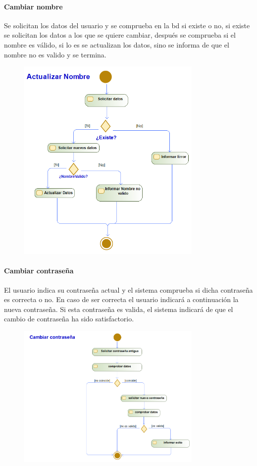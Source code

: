 \paragraph{Cambiar nombre}
Se solicitan los datos del usuario y se comprueba en la \gls{bd} si existe o no, si existe se solicitan los datos a los que se quiere cambiar, después se comprueba si el nombre es válido, si lo es se actualizan los datos, sino se informa de que el nombre no es valido y se termina.
\begin{figure}[H]
    \centering
    \includegraphics[width=0.8\textwidth]{Use_Cases/Actualizar Nombre.png}
\end{figure}
\paragraph{Cambiar contraseña}
El usuario indica su contraseña actual y el sistema comprueba si dicha contraseña es correcta o no. En caso de ser correcta el usuario indicará a continuación la nueva contraseña. Si esta contraseña es valida, el sistema indicará de que el cambio de contraseña ha sido satisfactorio.
\begin{figure}[H]
    \centering
    \includegraphics[width=0.8\textwidth]{Use_Cases/cambiar_contrasena.png}
\end{figure}
